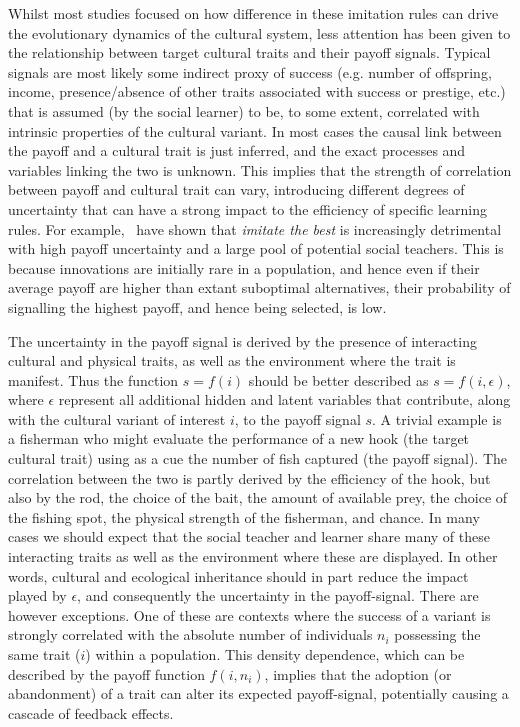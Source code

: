 \documentclass[review,authoryear]{elsarticle}
\begin{document}
Whilst most studies focused on how difference in these imitation rules can drive the evolutionary dynamics of the cultural system, less attention has been given to the relationship between target cultural traits and their payoff signals. Typical signals are most likely some indirect proxy of success (e.g. number of offspring, income, presence/absence of other traits associated with success or prestige, etc.)  that is assumed (by the social learner) to be, to some extent,  correlated with intrinsic properties of the cultural variant. In most cases the causal link between the payoff and a cultural trait is just inferred, and the exact processes and variables linking the two is unknown. This implies that the strength of correlation between payoff and cultural trait can vary, introducing different degrees of uncertainty that can have a strong impact to the efficiency of specific learning rules. For example,~\citet{crema_lake_inpress} have shown that \emph{imitate the best} is increasingly detrimental with high payoff uncertainty and a large pool of potential social teachers. This is because innovations are initially rare in a population, and hence even if their average payoff are higher than extant suboptimal alternatives, their probability of signalling the highest payoff, and hence being selected, is low.

The uncertainty in the payoff signal is derived by the presence of interacting cultural and physical traits, as well as the environment where the trait is manifest. Thus the function $s=f(i)$ should be better described as $s=f(i,\epsilon)$, where $\epsilon$ represent all additional hidden and latent variables that contribute, along with the cultural variant of interest $i$, to the payoff signal $s$. A trivial example is a fisherman who might evaluate the performance of a new hook (the target cultural trait) using as a cue the number of fish captured (the payoff signal). The correlation between the two is partly derived by the efficiency of the hook, but also by the rod, the choice of the bait, the amount of available prey, the choice of the fishing spot, the physical strength of the fisherman, and chance. In many cases we should expect that the social teacher and learner share many of these interacting traits as well as the environment where these are displayed. In other words, cultural and ecological inheritance should in part reduce the impact played by $\epsilon$, and consequently the uncertainty in the payoff-signal. There are however exceptions. One of these are contexts where the success of a variant is strongly correlated with the absolute number of individuals $n_i$ possessing the same trait ($i$) within a population. This density dependence, which can be described by the payoff function $f(i,n_i)$, implies that the adoption (or abandonment) of a trait can alter its expected payoff-signal, potentially causing a cascade of feedback effects.  
\end{document}
